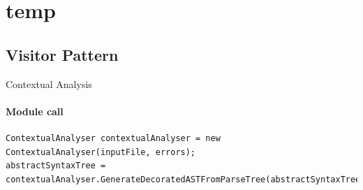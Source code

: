 \section{temp}
\subsection{Visitor Pattern}

\begin{frame}{Contextual Analysis}
\framesubtitle{Module call}

    \begin{lstlisting}
ContextualAnalyser contextualAnalyser = new ContextualAnalyser(inputFile, errors);
abstractSyntaxTree = contextualAnalyser.GenerateDecoratedASTFromParseTree(abstractSyntaxTree);
    \end{lstlisting}


\end{frame}

